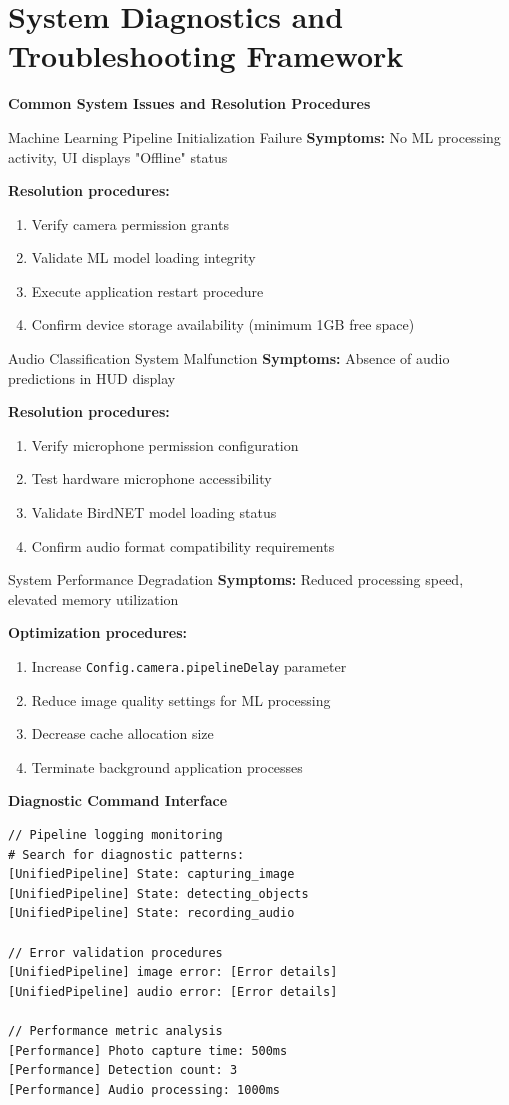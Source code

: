 \section{System Diagnostics and Troubleshooting Framework}

\textbf{Common System Issues and Resolution Procedures}

Machine Learning Pipeline Initialization Failure
\textbf{Symptoms:} No ML processing activity, UI displays "Offline" status

\textbf{Resolution procedures:}
\begin{enumerate}
    \item Verify camera permission grants
    \item Validate ML model loading integrity
    \item Execute application restart procedure
    \item Confirm device storage availability (minimum 1GB free space)
\end{enumerate}

Audio Classification System Malfunction
\textbf{Symptoms:} Absence of audio predictions in HUD display

\textbf{Resolution procedures:}
\begin{enumerate}
    \item Verify microphone permission configuration
    \item Test hardware microphone accessibility
    \item Validate BirdNET model loading status
    \item Confirm audio format compatibility requirements
\end{enumerate}

System Performance Degradation
\textbf{Symptoms:} Reduced processing speed, elevated memory utilization

\textbf{Optimization procedures:}
\begin{enumerate}
    \item Increase \texttt{Config.camera.pipelineDelay} parameter
    \item Reduce image quality settings for ML processing
    \item Decrease cache allocation size
    \item Terminate background application processes
\end{enumerate}

\textbf{Diagnostic Command Interface}
\begin{lstlisting}[caption=Debug Commands, label=lst:debug_commands]
// Pipeline logging monitoring
# Search for diagnostic patterns:
[UnifiedPipeline] State: capturing_image
[UnifiedPipeline] State: detecting_objects
[UnifiedPipeline] State: recording_audio

// Error validation procedures
[UnifiedPipeline] image error: [Error details]
[UnifiedPipeline] audio error: [Error details]

// Performance metric analysis
[Performance] Photo capture time: 500ms
[Performance] Detection count: 3
[Performance] Audio processing: 1000ms
\end{lstlisting}

